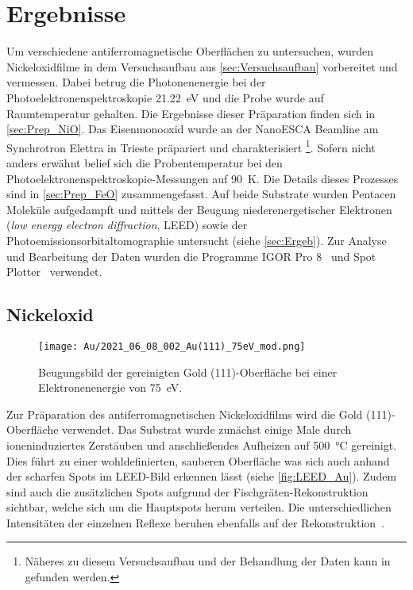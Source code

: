 \chapter{Ergebnisse}
    Um verschiedene antiferromagnetische Oberflächen zu untersuchen, wurden Nickeloxidfilme in dem Versuchsaufbau aus \autoref{sec:Versuchsaufbau} vorbereitet und vermessen.
    Dabei betrug die Photonenenergie bei der Photoelektronenspektroskopie \SI{21.22}{\electronvolt} und die Probe wurde auf Raumtemperatur gehalten.
    Die Ergebnisse dieser Präparation finden sich in \autoref{sec:Prep_NiO}.
    Das Eisenmonooxid wurde an der NanoESCA Beamline am Synchrotron Elettra in Trieste präpariert und charakterisiert \footnote{Näheres zu diesem Versuchsaufbau und der Behandlung der Daten kann in~\cite{ma-DJ} gefunden werden.}.
    Sofern nicht anders erwähnt belief sich die Probentemperatur bei den Photoelektronenspektroskopie-Messungen auf \SI{90}{\kelvin}.
    Die Details dieses Prozesses sind in \autoref{sec:Prep_FeO} zusammengefasst.
    Auf beide Substrate wurden Pentacen Moleküle aufgedampft und mittels der Beugung niederenergetischer Elektronen (\textit{low energy electron diffraction}, LEED) sowie der Photoemissionsorbitaltomographie untersucht (siehe \autoref{sec:Ergeb}).
    Zur Analyse und Bearbeitung der Daten wurden die Programme IGOR Pro 8~\cite{IGOR} und Spot Plotter~\cite{SpotPlotter} verwendet. %

    \section{Nickeloxid} \label{sec:Prep_NiO}
        \begin{figure}
            \centering
            \texttt{[image: Au/2021\_06\_08\_002\_Au(111)\_75eV\_mod.png]}            
            \caption{Beugungsbild der gereinigten Gold (111)-Oberfläche bei einer Elektronenenergie von \SI{75}{\electronvolt}.}
            \label{fig:LEED_Au}
        \end{figure}
        Zur Präparation des antiferromagnetischen Nickeloxidfilms wird die Gold (111)-Oberfläche verwendet.
        Das Substrat wurde zunächst einige Male durch ioneninduziertes Zerstäuben und anschließendes Aufheizen auf \SI{500}{\celsius} gereinigt.
        Dies führt zu einer wohldefinierten, sauberen Oberfläche was sich auch anhand der scharfen Spots im LEED-Bild erkennen lässt (siehe \autoref{fig:LEED_Au}).
        Zudem sind auch die zusätzlichen Spots aufgrund der Fischgräten-Rekonstruktion sichtbar, welche sich um die Hauptspots herum verteilen.
        Die unterschiedlichen Intensitäten der einzelnen Reflexe beruhen ebenfalls auf der Rekonstruktion~\cite{haag_epitaxial_2016}.

